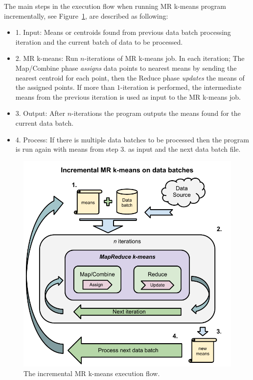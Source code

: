 The main steps in the execution flow when running MR k-means program incrementally, see Figure~\ref{fig:mrkmeansprocess}, are described as following:
\begin{itemize}
\item 1. Input: Means or centroids found from previous data batch processing iteration and the current batch of data to be processed.
\item 2. MR k-means: Run $n$-iterations of MR k-means job. In each iteration; The Map/Combine phase \textit{assigns} data points to nearest means by sending the nearest centroid for each point, then the Reduce phase \textit{updates} the means of the assigned points. If more than $1$-iteration is performed, the intermediate means from the previous iteration is used as input to the MR k-means job.
\item 3. Output: After $n$-iterations the program outputs the means found for the current data batch.
\item 4. Process: If there is multiple data batches to be processed then the program is run again with means from step 3. as input and the next data batch file.
\end{itemize}

\begin{figure}[ht]
\centering
\includegraphics[width=1.0\textwidth]{Figures/IncrementalMRKmeansExecutionProcess.pdf}
\caption{The incremental MR k-means execution flow.}
\label{fig:mrkmeansprocess}
\end{figure}


